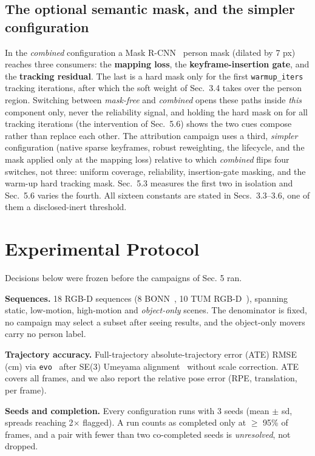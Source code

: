 \subsection{The optional semantic mask, and the simpler configuration}


In the \emph{combined} configuration a Mask R-CNN~\cite{maskrcnn} person mask (dilated by 7 px) reaches three consumers: the \textbf{mapping loss}, the \textbf{keyframe-insertion gate}, and the \textbf{tracking residual}. The last is a hard mask only for the first \texttt{warmup\_iters} tracking iterations, after which the soft weight of Sec.~3.4 takes over the person region. Switching between \emph{mask-free} and \emph{combined} opens these paths inside \emph{this} component only, never the reliability signal, and holding the hard mask on for all tracking iterations (the intervention of Sec.~5.6) shows the two cues compose rather than replace each other. The attribution campaign uses a third, \emph{simpler} configuration (native sparse keyframes, robust reweighting, the lifecycle, and the mask applied only at the mapping loss) relative to which \emph{combined} flips four switches, not three: uniform coverage, reliability, insertion-gate masking, and the warm-up hard tracking mask. Sec.~5.3 measures the first two in isolation and Sec.~5.6 varies the fourth. All sixteen constants are stated in Secs.~3.3--3.6, one of them a disclosed-inert threshold.




\section{Experimental Protocol}


Decisions below were frozen before the campaigns of Sec. 5 ran.


\textbf{Sequences.} 18 RGB-D sequences (8 BONN~\cite{bonn}, 10 TUM RGB-D~\cite{tumrgbd}), spanning static, low-motion, high-motion and \emph{object-only} scenes. The denominator is fixed, no campaign may select a subset after seeing results, and the object-only movers carry no person label.


\textbf{Trajectory accuracy.} Full-trajectory absolute-trajectory error (ATE) RMSE (cm) via \texttt{evo}~\cite{evo} after SE(3) Umeyama alignment~\cite{umeyama} without scale correction. ATE covers all frames, and we also report the relative pose error (RPE, translation, per frame).


\textbf{Seeds and completion.} Every configuration runs with 3 seeds (mean $\pm$ sd, spreads reaching 2$\times$ flagged). A run counts as completed only at $\ge$ 95\% of frames, and a pair with fewer than two co-completed seeds is \emph{unresolved}, not dropped.


